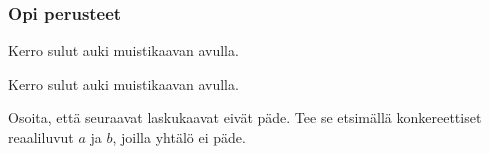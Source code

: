 
\begin{tehtavasivu}

\subsubsection*{Opi perusteet}

\begin{tehtava}
    Kerro sulut auki muistikaavan avulla.
    \begin{alakohdat}
    \end{alakohdat}
    \begin{vastaus}
        \begin{alakohdat}
        \end{alakohdat}
    \end{vastaus}
\end{tehtava}

\begin{tehtava}
    Kerro sulut auki muistikaavan avulla.
    \begin{alakohdat}
    \end{alakohdat}
    \begin{vastaus}
        \begin{alakohdat}
        \end{alakohdat}
    \end{vastaus}
\end{tehtava}

\begin{tehtava}
Osoita, että seuraavat laskukaavat eivät päde. Tee se etsimällä konkereettiset reaaliluvut $a$ ja $b$, joilla yhtälö ei päde.
        \begin{alakohdat}
        \end{alakohdat}
        \begin{vastaus}
        \begin{alakohdatrivi}
        \end{alakohdatrivi}
        \end{vastaus}
\end{tehtava}


\end{tehtavasivu}
